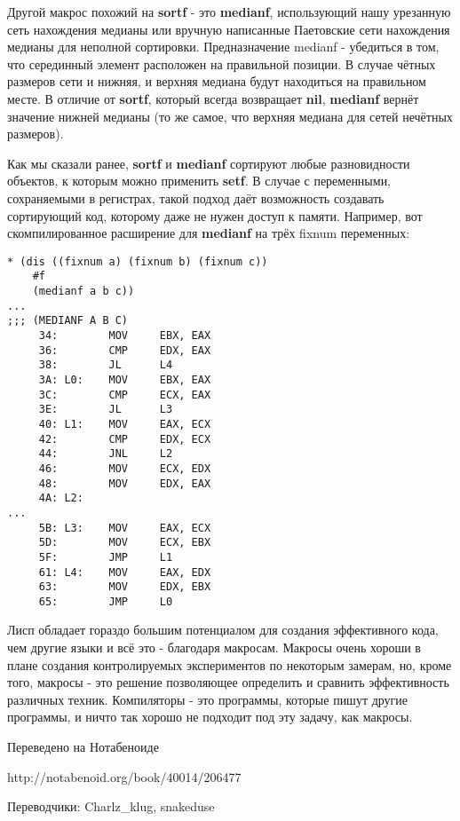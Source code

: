 Другой макрос похожий на \textbf{sortf} - это \textbf{medianf}, использующий нашу урезанную сеть нахождения медианы или вручную написанные Паетовские сети нахождения медианы для неполной сортировки. Предназначение medianf - убедиться в том, что серединный элемент расположен на правильной позиции. В случае чётных размеров сети и нижняя, и верхняя медиана будут находиться на правильном месте. В отличие от \textbf{sortf}, который всегда возвращает \textbf{nil}, \textbf{medianf} вернёт значение нижней медианы (то же самое, что верхняя медиана для сетей нечётных размеров).

Как мы сказали ранее, \textbf{sortf} и \textbf{medianf} сортируют любые разновидности объектов, к которым можно применить \textbf{setf}. В случае с переменными, сохраняемыми в регистрах, такой подход даёт возможность создавать сортирующий код, которому даже не нужен доступ к памяти. Например, вот скомпилированное расширение для \textbf{medianf} на трёх fixnum переменных:

\begin{verbatim}
* (dis ((fixnum a) (fixnum b) (fixnum c))
    #f
    (medianf a b c))
...
;;; (MEDIANF A B C)
     34:        MOV     EBX, EAX
     36:        CMP     EDX, EAX
     38:        JL      L4
     3A: L0:    MOV     EBX, EAX
     3C:        CMP     ECX, EAX
     3E:        JL      L3
     40: L1:    MOV     EAX, ECX
     42:        CMP     EDX, ECX
     44:        JNL     L2
     46:        MOV     ECX, EDX
     48:        MOV     EDX, EAX
     4A: L2:
...
     5B: L3:    MOV     EAX, ECX
     5D:        MOV     ECX, EBX
     5F:        JMP     L1
     61: L4:    MOV     EAX, EDX
     63:        MOV     EDX, EBX
     65:        JMP     L0 
\end{verbatim}

Лисп обладает гораздо большим потенциалом для создания эффективного кода, чем другие языки и всё это - благодаря макросам. Макросы очень хороши в плане создания контролируемых экспериментов по некоторым замерам, но, кроме того, макросы - это решение позволяющее определить и сравнить эффективность различных техник. Компиляторы - это программы, которые пишут другие программы, и ничто так хорошо не подходит под эту задачу, как макросы.

Переведено на Нотабеноиде

http://notabenoid.org/book/40014/206477

Переводчики: Charlz\_klug, snakeduse

